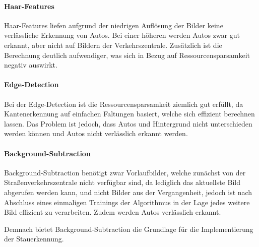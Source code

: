 \paragraph{Haar-Features}
Haar-Features liefen aufgrund der niedrigen Auflösung der Bilder keine verlässliche Erkennung von Autos. Bei einer höheren werden Autos zwar gut erkannt, aber nicht auf Bildern der Verkehrszentrale. Zusätzlich ist die Berechnung deutlich aufwendiger, was sich in Bezug auf Ressourcensparsamkeit negativ auswirkt.

\paragraph{Edge-Detection}
Bei der Edge-Detection ist die Ressourcensparsamkeit ziemlich gut erfüllt, da Kantenerkennung auf einfachen Faltungen basiert, welche sich effizient berechnen lassen.
Das Problem ist jedoch, dass Autos und Hintergrund nicht unterschieden werden können und Autos nicht verlässlich erkannt werden.

\paragraph{Background-Subtraction}
Background-Subtraction benötigt zwar Vorlaufbilder, welche zunächst von der Straßenverkehrszentrale nicht verfügbar sind, da lediglich das aktuellste Bild abgerufen werden kann, und nicht Bilder aus der Vergangenheit, jedoch ist nach Abschluss eines einmaligen Trainings der Algorithmus in der Lage jedes weitere Bild effizient zu verarbeiten. Zudem werden Autos verlässlich erkannt.

Demnach bietet Background-Subtraction die Grundlage für die Implementierung der Stauerkennung.
